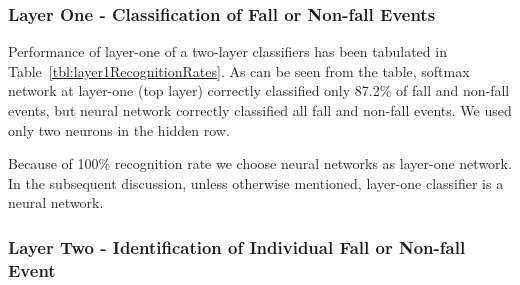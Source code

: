 \documentclass{IEEEtran}
\begin{document}
\subsubsection{Layer One - Classification of Fall or Non-fall Events }
\label{sec:LayerOneFallAndNonFallIdentification}

Performance of layer-one of a two-layer classifiers has been tabulated in Table~\ref{tbl:layer1RecognitionRates}. As can be seen from the table, softmax network at layer-one (top layer) correctly classified only 87.2\% of fall and non-fall events, but neural network correctly classified all fall and non-fall events. We used only two neurons in the hidden row.
\par
 Because of  100\% recognition rate we choose neural networks as layer-one network. In the subsequent discussion, unless otherwise mentioned,  layer-one classifier is a neural network.

%

\subsubsection{Layer Two - Identification of Individual Fall or Non-fall Event}
\label{sec:LayerTwoFallOrNonFallEventIdentification}
\end{document}
